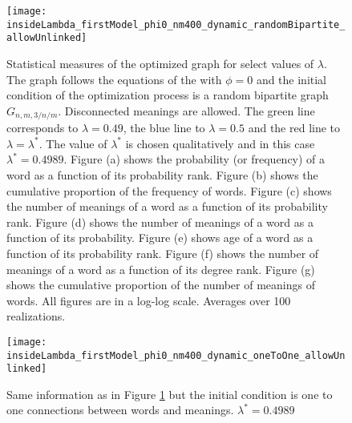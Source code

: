 \begin{figure}
  \centering
  \texttt{[image: insideLambda\_firstModel\_phi0\_nm400\_dynamic\_randomBipartite\_allowUnlinked]}
  \caption{
    Statistical measures of the optimized graph for select values of $\lambda$.
    The graph follows the equations of the \firstmodel{} with $\phi=0$ and the initial condition of the optimization process is a random bipartite graph $G_{n,m,3/n/m}$. Disconnected meanings are allowed.
    The green line corresponds to $\lambda=0.49$, the blue line to $\lambda=0.5$ and the red line to $\lambda=\lambda^*$.
    The value of $\lambda^*$ is chosen qualitatively and in this case $\lambda^*=0.4989$.
    Figure (a) shows the probability (or frequency) of a word as a function of its probability rank.
    Figure (b) shows the cumulative proportion of the frequency of words.
    Figure (c) shows the number of meanings of a word as a function of its probability rank.
    Figure (d) shows the number of meanings of a word as a function of its probability.
    Figure (e) shows age of a word as a function of its probability rank.
    Figure (f) shows the number of meanings of a word as a function of its degree rank.
    Figure (g) shows the cumulative proportion of the number of meanings of words.
    All figures are in a log-log scale.
    Averages over 100 realizations.
  }
  \label{fig:insideLambda_firstModel_phi0_nm400_dynamic_randomBipartite_allowUnlinked}
\end{figure}

\begin{figure}
  \centering
  \texttt{[image: insideLambda\_firstModel\_phi0\_nm400\_dynamic\_oneToOne\_allowUnlinked]}
  \caption{Same information as in Figure \ref{fig:insideLambda_firstModel_phi0_nm400_dynamic_randomBipartite_allowUnlinked} but the initial condition is one to one connections between words and meanings. $\lambda^* = 0.4989$}
  \label{fig:insideLambda_firstModel_phi0_nm400_dynamic_oneToOne_allowUnlinked}
\end{figure}

